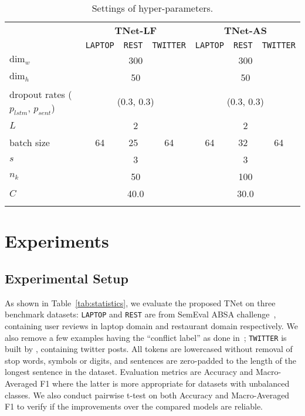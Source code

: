 \documentclass[11pt,a4paper]{article}
\begin{document}
\begin{table*}[!t]
    \centering
{\begin{tabular}{l|ccc|ccc}
    \Xhline{3\arrayrulewidth}
    \multirow{2}{*}{\textbf{Hyper-params}} & \multicolumn{3}{c}{\textbf{TNet-LF}} & \multicolumn{3}{|c}{\textbf{TNet-AS}} \\ \cline{2-7}
    & \texttt{LAPTOP} & \texttt{REST} & \texttt{TWITTER} & \texttt{LAPTOP} & \texttt{REST} & \texttt{TWITTER} \\ \hline
    $\mathrm{dim}_w$ & \multicolumn{3}{c}{300} & \multicolumn{3}{|c}{300} \\ $\mathrm{dim}_h$ & \multicolumn{3}{c}{50} & \multicolumn{3}{|c}{50}  \\ dropout rates ($p_{lstm}$, $p_{sent}$) & \multicolumn{3}{|c}{(0.3, 0.3)} & \multicolumn{3}{|c}{(0.3, 0.3)} \\ $L$ & \multicolumn{3}{c}{2} & \multicolumn{3}{|c}{2} \\
    batch size & 64 & 25 & 64 & 64 & 32 & 64 \\ $s$ & \multicolumn{3}{c}{3} & \multicolumn{3}{|c}{3} \\ $n_k$ & \multicolumn{3}{c}{50} & \multicolumn{3}{|c}{100} \\ $C$ & \multicolumn{3}{c}{40.0} & \multicolumn{3}{|c}{30.0} \\
    \Xhline{3\arrayrulewidth}
    \end{tabular}}
    \caption{Settings of hyper-parameters.}
    \label{tab:hyperparameter}
\end{table*}


\section{Experiments}
\subsection{Experimental Setup}
As shown in Table~\ref{tab:statistics}, we evaluate the proposed TNet on three benchmark datasets: \texttt{LAPTOP} and \texttt{REST} are from SemEval ABSA challenge~\cite{pontiki-EtAl:2014:SemEval}, containing user reviews in laptop domain and restaurant domain respectively. We also remove a few examples having the ``conflict label'' as done in~\cite{chen-EtAl:2017:EMNLP20171}; \texttt{TWITTER} is built by \citet{dong-EtAl:2014:P14-2}, containing twitter posts. All tokens are lowercased without removal of stop words, symbols or digits, and sentences are zero-padded to the length of the longest sentence in the dataset. Evaluation metrics are Accuracy and Macro-Averaged F1 where the latter is more appropriate for datasets with unbalanced classes. We also conduct pairwise t-test on both Accuracy and Macro-Averaged F1 to verify if the improvements over the compared models are reliable.
\end{document}
